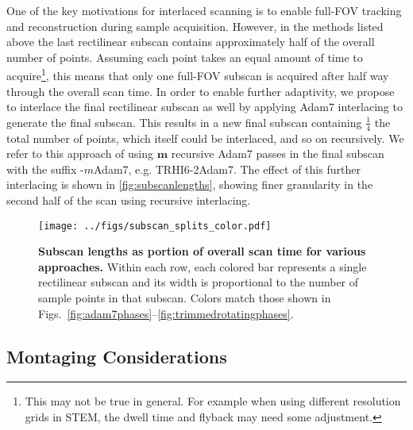 \documentclass[aip, amsmath, amssymb, nobibnotes, nofootinbib, citeautoscript, reprint, superscriptaddress]{revtex4-1}
\begin{document}
    One of the key motivations for interlaced scanning is to enable full-FOV tracking and reconstruction during sample acquisition.
    However, in the methods listed above the last rectilinear subscan contains approximately half of the overall number of points.
    Assuming each point takes an equal amount of time to acquire\footnote{This may not be true in general. For example when using different resolution grids in STEM, the dwell time and flyback may need some adjustment.}, this means that only one full-FOV subscan is acquired after half way through the overall scan time.
    In order to enable further adaptivity, we propose to interlace the final rectilinear subscan as well by applying Adam7 interlacing to generate the final subscan.
    This results in a new final subscan containing $\mathrm{\frac{1}{4}}$ the total number of points, which itself could be interlaced, and so on recursively.
    We refer to this approach of using $\mathbf{m}$ recursive Adam7 passes in the final subscan with the suffix -$\mathit{m}$Adam7, e.g. TRHI6-2Adam7.
    The effect of this further interlacing is shown in \autoref{fig:subscanlengths}, showing finer granularity in the second half of the scan using recursive interlacing.


    \begin{figure*}
        \centering
        \texttt{[image: ../figs/subscan\_splits\_color.pdf]}
        \caption{
            \label{fig:subscanlengths} 
            \textbf{Subscan lengths as portion of overall scan time for various approaches.}
            Within each row, each colored bar represents a single rectilinear subscan and its width is proportional to the number of sample points in that subscan.
                Colors match those shown in
                Figs.~\autoref{fig:adam7phases}--\autoref{fig:trimmedrotatingphases}.
            }
    \end{figure*}


    \subsection{\label{ssec:montaging}Montaging Considerations}
\end{document}
